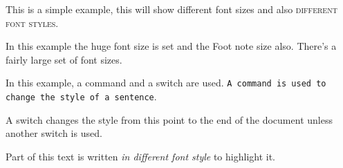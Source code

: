 \documentclass{article}
\begin{document}
	This is a simple example, {\tiny this will show different font sizes} and also \textsc{different font styles}. 
	
	\vspace{1cm}
	
	In this example the {\huge huge font size} is set and the {\footnotesize Foot note size also}. There's a fairly large set of font sizes.
	
	\vspace{1cm}
	
	In this example, a command and a switch are used. \texttt{A command is used to change the style of a sentence}.
	
	\sffamily
	A switch changes the style from this point to the end of the document unless another switch is used.
	\rmfamily
	
	\vspace{1cm}
	
	Part of this text is written \textsl{in different font style} to highlight it.
\end{document}
